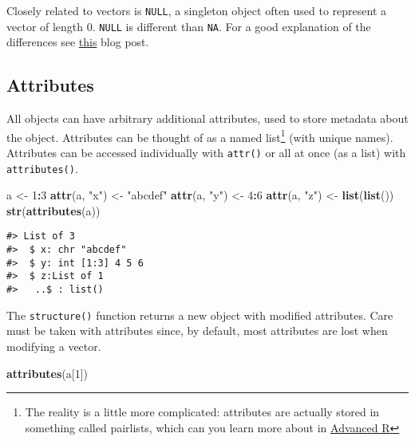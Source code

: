 \documentclass[]{book}
\newenvironment{Shaded}{\begin{snugshade}}{\end{snugshade}}
\newcommand{\KeywordTok}[1]{\textcolor[rgb]{0.13,0.29,0.53}{\textbf{#1}}}
\newcommand{\DecValTok}[1]{\textcolor[rgb]{0.00,0.00,0.81}{#1}}
\newcommand{\StringTok}[1]{\textcolor[rgb]{0.31,0.60,0.02}{#1}}
\newcommand{\OperatorTok}[1]{\textcolor[rgb]{0.81,0.36,0.00}{\textbf{#1}}}
\newcommand{\NormalTok}[1]{#1}
\let\rmarkdownfootnote\footnote%
\def\footnote{\protect\rmarkdownfootnote}
\theoremstyle{definition}
\theoremstyle{definition}
\theoremstyle{definition}
\theoremstyle{remark}
\begin{document}
Closely related to vectors is \texttt{NULL}, a singleton object often
used to represent a vector of length 0. \texttt{NULL} is different than
\texttt{NA}. For a good explanation of the differences see
\href{https://www.r-bloggers.com/r-na-vs-null/}{this} blog post.

\subsection{Attributes}\label{attributes}

All objects can have arbitrary additional attributes, used to store
metadata about the object. Attributes can be thought of as a named
list\footnote{The reality is a little more complicated: attributes are
  actually stored in something called pairlists, which can you learn
  more about in \href{http://adv-r.had.co.nz}{Advanced R}} (with unique
names). Attributes can be accessed individually with \texttt{attr()} or
all at once (as a list) with \texttt{attributes()}.

\begin{Shaded}
\begin{Highlighting}[]
\NormalTok{a <-}\StringTok{ }\DecValTok{1}\OperatorTok{:}\DecValTok{3}
\KeywordTok{attr}\NormalTok{(a, }\StringTok{"x"}\NormalTok{) <-}\StringTok{ "abcdef"}
\KeywordTok{attr}\NormalTok{(a, }\StringTok{"y"}\NormalTok{) <-}\StringTok{ }\DecValTok{4}\OperatorTok{:}\DecValTok{6}
\KeywordTok{attr}\NormalTok{(a, }\StringTok{"z"}\NormalTok{) <-}\StringTok{ }\KeywordTok{list}\NormalTok{(}\KeywordTok{list}\NormalTok{())}
\KeywordTok{str}\NormalTok{(}\KeywordTok{attributes}\NormalTok{(a))}
\end{Highlighting}
\end{Shaded}

\begin{verbatim}
#> List of 3
#>  $ x: chr "abcdef"
#>  $ y: int [1:3] 4 5 6
#>  $ z:List of 1
#>   ..$ : list()
\end{verbatim}

The \texttt{structure()} function returns a new object with modified
attributes. Care must be taken with attributes since, by default, most
attributes are lost when modifying a vector.

\begin{Shaded}
\begin{Highlighting}[]
\KeywordTok{attributes}\NormalTok{(a[}\DecValTok{1}\NormalTok{])}
\end{Highlighting}
\end{Shaded}
\end{document}
